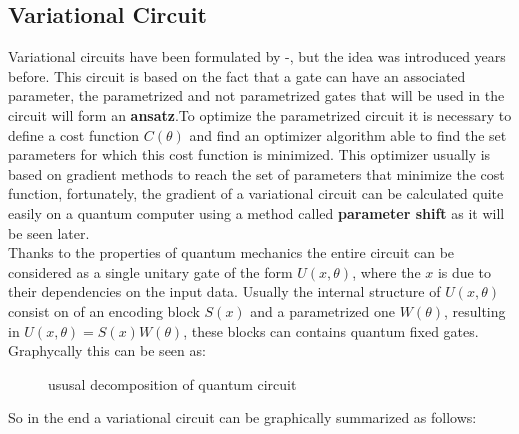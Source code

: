 \subsection{Variational Circuit}
Variational circuits have been formulated by \cite{https://doi.org/10.48550/arxiv.1802.06002}-\cite{Benedetti_2019}, but the idea was introduced years before. This circuit is based on the fact that a gate can have an associated parameter, the parametrized and not parametrized gates that will be used in the circuit will form an \textbf{ansatz}.To optimize the parametrized circuit it is necessary to define a cost function $C(\theta)$ and find an optimizer algorithm able to find the set parameters for which this cost function is minimized. This optimizer usually is based on gradient methods to reach the set of parameters that minimize the cost function, fortunately, the gradient of a variational circuit can be calculated quite easily on a quantum computer using a method called \textbf{parameter shift} as it will be seen later.\\
Thanks to the properties of quantum mechanics the entire circuit can be considered as a single unitary gate of the form $U(x,\theta)$, where the $x$ is due to their dependencies on the input data. Usually the internal structure of $U(x,\theta)$ consist on of an encoding block $S(x)$ and a parametrized one $W(\theta)$, resulting in $U(x,\theta) = S(x)W(\theta)$, these blocks can contains quantum fixed gates. Graphycally this can be seen as:\\
\begin{center}
	\begin{figure}[!h]
		\centering
		\caption{ususal decomposition of quantum circuit}
		\label{sw}
	\end{figure}
\end{center}
So in the end a variational circuit can be graphically summarized as follows:\\
